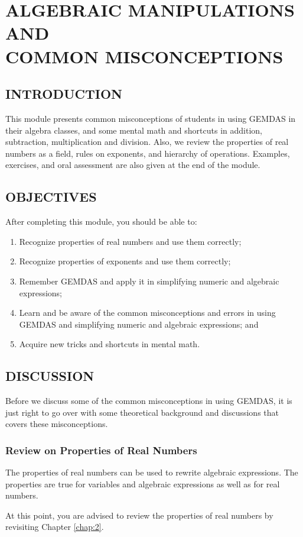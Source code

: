 \chapter{ALGEBRAIC MANIPULATIONS AND\\ COMMON MISCONCEPTIONS}
\section*{INTRODUCTION}
This module presents common misconceptions of students in using GEMDAS in their algebra
classes, and some mental math and shortcuts in addition, subtraction, multiplication and division.
Also, we review the properties of real numbers as a field, rules on exponents, and hierarchy of
operations. Examples, exercises, and oral assessment are also given at the end of the module.
\section*{OBJECTIVES}
After completing this module, you should be able to:
\begin{enumerate}
\item Recognize properties of real numbers and use them correctly;
\item Recognize properties of exponents and use them correctly;
\item Remember GEMDAS and apply it in simplifying numeric and algebraic expressions;
\item Learn and be aware of the common misconceptions and errors in using GEMDAS and
simplifying numeric and algebraic expressions; and
\item Acquire new tricks and shortcuts in mental math.
\end{enumerate}
\section*{DISCUSSION}
Before we discuss some of the common misconceptions in using GEMDAS, it is just right to
go over with some theoretical background and discussions that covers these misconceptions.
\subsection*{Review on Properties of Real Numbers}
The properties of real numbers can be used to rewrite algebraic expressions. The properties
are true for variables and algebraic expressions as well as for real numbers.

At this point, you are advised to review the properties of real numbers by revisiting Chapter \ref{chap:2}.
